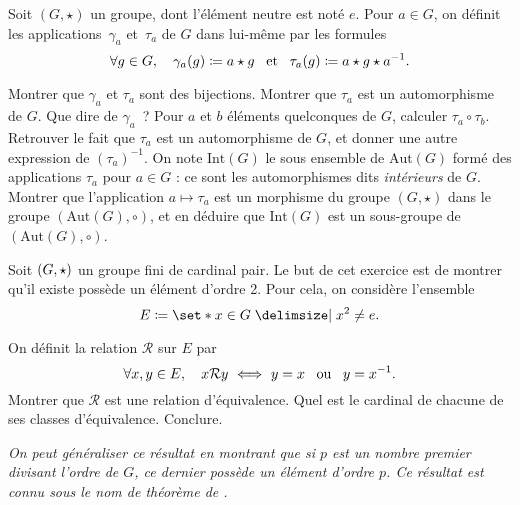\documentclass{magnolia}
\begin{document}

Soit $(G,\star)$ un groupe, dont l'élément neutre est noté $e$. Pour $a\in G$,
on définit les  applications~$\gamma_a$ et~$\tau_a$ de $G$ dans lui-même par les
formules
\[\forall g\in G ,\quad \gamma_a(g)\coloneqq a\star g \quad\!\text{et}\quad\! \tau_a(g)\coloneqq a\star g\star a^{-1}.\]
\begin{questions}
\question Montrer que $\gamma_a$ et $\tau_a$ sont des bijections. Montrer que
  $\tau_a$ est un automorphisme de $G$. Que dire de $\gamma_a$~?
\question Pour $a$ et $b$ éléments quelconques de $G$, calculer
  $\tau_a\circ \tau_b$. Retrouver le fait que $\tau_a$ est un automorphisme de $G$,
  et donner une autre expression de $(\tau_a)^{-1}$.
\question On note $\text{Int}(G)$ le sous ensemble de $\text{Aut}(G)$ formé
  des applications $\tau_a$ pour $a\in G$ : ce sont les automorphismes dits
  {\em intérieurs}\/ de $G$. Montrer  que l'application $a\mapsto \tau_a$ est
  un morphisme  du groupe $(G,\star )$ dans  le groupe $(\text{Aut}(G),\circ)$, et en
  déduire que $\text{Int}(G)$ est un sous-groupe de $(\text{Aut}(G),\circ)$.
\end{questions}

Soit $\left(G,\star\right)$ un groupe fini de cardinal pair. Le but de cet exercice est
de montrer qu'il existe possède un élément d'ordre 2.
Pour cela, on considère l'ensemble
\[E\defeq\enstq{x\in G}{x^2\neq e}.\]
\begin{questions}
\question On définit la relation $\mathcal{R}$ sur $E$ par
  \[\forall x, y\in E\qsep x\mathcal{R}y\ \ssi\ y=x \ou y=x^{-1}.\]
  Montrer que $\mathcal{R}$ est une relation d'équivalence. Quel est le cardinal
  de chacune de ses classes d'équivalence.
\question Conclure.
\end{questions}
\emph{On peut généraliser ce résultat en montrant que si $p$ est un nombre premier divisant l'ordre de $G$, ce dernier possède un élément d'ordre $p$. Ce résultat est connu sous le nom de théorème de .}
\end{document}
